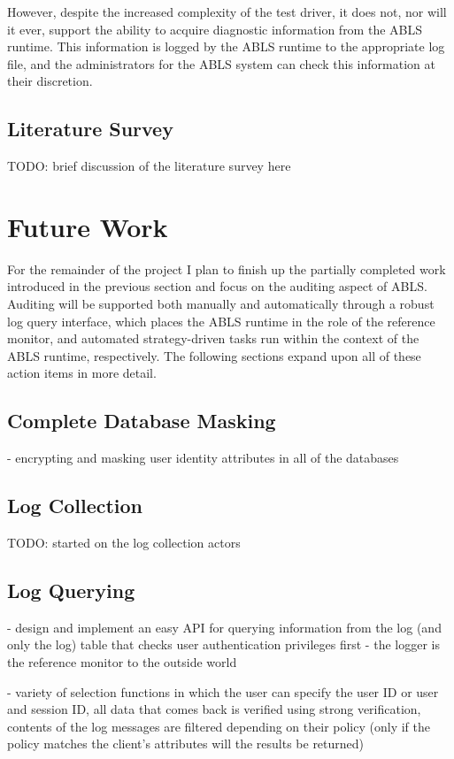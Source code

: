 \documentclass{sig-alternate}
\begin{document}
However, despite the increased complexity of the test driver, it does not, nor will it ever, support the ability to acquire 
diagnostic information from the ABLS runtime. This information is logged by the ABLS runtime to the appropriate log 
file, and the administrators for the ABLS system can check this information at their discretion.

\subsection{Literature Survey}
TODO: brief discussion of the literature survey here

\section{Future Work}
For the remainder of the project I plan to finish up the partially completed work introduced in the previous section and 
focus on the auditing aspect of ABLS. Auditing will be supported both manually and automatically through
a robust log query interface, which places the ABLS runtime in the role of the reference monitor, and automated
strategy-driven tasks run within the context of the ABLS runtime, respectively. The following sections expand upon all
of these action items in more detail.


\subsection{Complete Database Masking}
- encrypting and masking user identity attributes in all of the databases

\subsection{Log Collection}
TODO: started on the log collection actors

\subsection{Log Querying}
- design and implement an easy API for querying information from the log (and only the log) table that checks user authentication privileges first - the logger is the reference monitor to the outside world

- variety of selection functions in which the user can specify the user ID or user and session ID, all data that comes back
is verified using strong verification, contents of the log messages are filtered depending on their policy (only if the policy matches the client's attributes will the results be returned)
\end{document}
